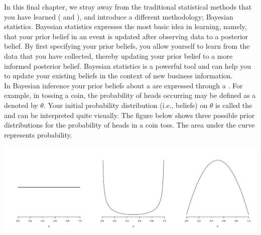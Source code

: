 \setcounter{chapter}{8}
\setcounter{section}{1}
\setcounter{question}{0}
\setcounter{hint}{0} %



In this final chapter, we stray away from the traditional statistical methods that you have learned ( and ), and introduce a different methodology; Bayesian statistics. Bayesian statistics expresses the most basic idea in learning, namely, that your prior belief in an event is updated after observing data to a posterior belief. By first specifying your prior beliefs, you allow yourself to learn from the data that you have collected, thereby updating your prior belief to a more informed posterior belief. Bayesian statistics is a powerful tool and can help you to update your existing beliefs in the context of new business information. \\

In Bayesian inference your prior beliefs about a  are expressed through a . For example, in tossing a coin, the probability of heads occurring may be defined as a  denoted by $\theta$. Your initial probability distribution (i.e., beliefs) on $\theta$ is called the  and can be interpreted quite visually. The figure below shows three possible prior distributions for the probability of heads in a coin toss. The area under the curve represents probability.

\begin{center}
    \includegraphics[width=\textwidth]{Files/Images/priorDistributions.pdf}
\end{center}


